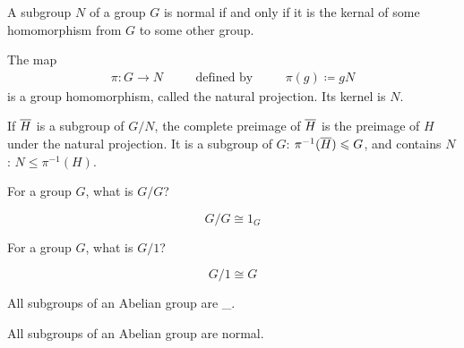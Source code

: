 \documentclass[a5paper]{article}
\begin{document}
\begin{lemma}
	A subgroup $N$ of a group $G$ is normal if and only if it is the kernal of
  some homomorphism from $G$ to some other group.
\end{lemma}

\begin{definition}
  The map
  \begin{align*}
    \pi:G\longrightarrow N
    &&\quad\text{defined by}\quad&&
    \pi(g)\coloneqq gN
  \end{align*}
  is a group homomorphism, called the natural projection. Its kernel is $N$.
\end{definition}

\begin{definition} %
	If $\overline{H}$ is a subgroup of $G/N$, the complete preimage of $\overline{H}$ is
  the preimage of $H$ under the natural projection. It is a subgroup of $G$:
  $\pi^{-1}(\overline{H})\leqslant G$, and contains $N$: $N\leqslant\pi^{-1}(H)$.
\end{definition}

\begin{note}
  \begin{field}
    For a group $G$, what is $G/G$?
  \end{field}

  \begin{field}
    \begin{equation*}
      G/G\cong 1_G
    \end{equation*}
  \end{field}
\end{note}

\begin{note}
  \begin{field}
    For a group $G$, what is $G/1$?
  \end{field}

  \begin{field}
    \begin{equation*}
      G/1\cong G
    \end{equation*}
  \end{field}
\end{note}

\begin{note}
  \begin{field}
    All subgroups of an Abelian group are \_.
  \end{field}

  \begin{field}
    All subgroups of an Abelian group are normal.
  \end{field}
\end{note}
\end{document}
